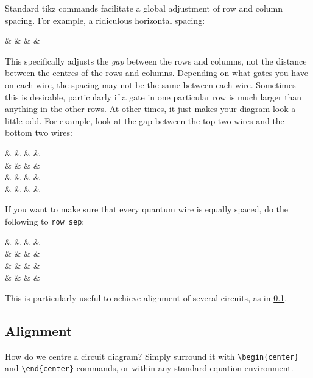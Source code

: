 \documentclass[aps,pra,10pt,nofootinbib]{revtex4-2}
\begin{document}
Standard tikz commands facilitate a global adjustment of row and column spacing. For example, a ridiculous horizontal spacing:
\begin{Code}
\begin{quantikz}[column sep=1cm]
&  & \phase{\beta} &  &
\end{quantikz}
\end{Code}
This specifically adjusts the \emph{gap} between the rows and columns, not the distance between the centres of the rows and columns. Depending on what gates you have on each wire, the spacing may not be the same between each wire. Sometimes this is desirable, particularly if a gate in one particular row is much larger than anything in the other rows. At other times, it just makes your diagram look a little odd. For example, look at the gap between the top two wires and the bottom two wires:
\begin{Code}
\begin{quantikz}[row sep=0.1cm]
&  &  &  & \\
& & \control{} &  & \\
&  & & & \\
&  & & & 
\end{quantikz}
\end{Code}
If you want to make sure that every quantum wire is equally spaced, do the following to \verb!row sep!:
\begin{Code}
\begin{quantikz}[row sep={0.6cm,between origins}]
&  &  &  & \\
& & \control{} & & \\
&  & & & \\
&  & & & 
\end{quantikz}
\end{Code}
This is particularly useful to achieve alignment of several circuits, as in \ref{sec:align}.


\subsection{Alignment}\label{sec:align}

How do we centre a circuit diagram? Simply surround it with \verb!\begin{center}! and \verb!\end{center}! commands, or within any standard equation environment.
\end{document}
